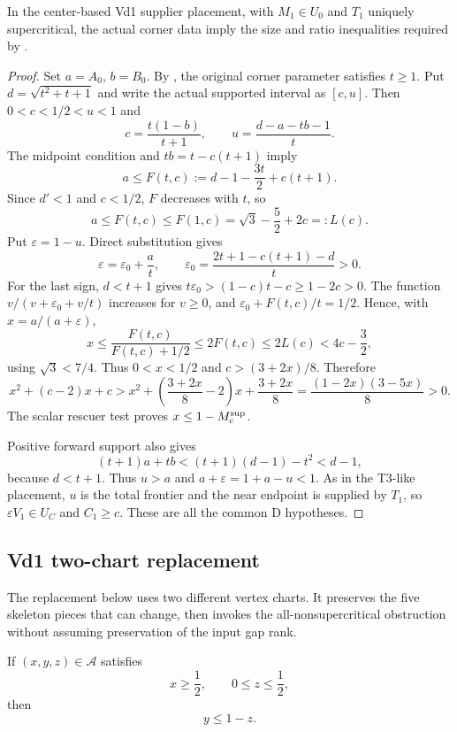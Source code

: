 \begin{lemma}
\label{lem:appendix-vd1-supported-tail}
In the center-based Vd1 supplier placement, with $M_1\in U_0$ and
$T_1$ uniquely supercritical, the actual corner data imply the size and
ratio inequalities required by .
\end{lemma}
\begin{proof}
Set $a=A_0$, $b=B_0$. By , the
original corner parameter satisfies $t\ge1$. Put
$d=\sqrt{t^2+t+1}$ and write the actual supported interval as $[c,u]$.
Then $0<c<1/2<u<1$ and
\[
 c=\frac{t(1-b)}{t+1},\qquad
 u=\frac{d-a-tb-1}{t}.
\]
The midpoint condition and $tb=t-c(t+1)$ imply
\[
 a\le F(t,c):=d-1-\frac{3t}{2}+c(t+1).
\]
Since $d'<1$ and $c<1/2$, $F$ decreases with $t$, so
\[
 a\le F(t,c)\le F(1,c)=\sqrt3-\frac52+2c=:L(c).
\]
Put $\varepsilon=1-u$. Direct substitution gives
\[
 \varepsilon=\varepsilon_0+\frac at,\qquad
 \varepsilon_0=\frac{2t+1-c(t+1)-d}{t}>0.
\]
For the last sign, $d<t+1$ gives
$t\varepsilon_0>(1-c)t-c\ge1-2c>0$.
The function $v/(v+\varepsilon_0+v/t)$ increases for $v\ge0$, and
$\varepsilon_0+F(t,c)/t=1/2$. Hence, with $x=a/(a+\varepsilon)$,
\[
 x\le\frac{F(t,c)}{F(t,c)+1/2}\le2F(t,c)\le2L(c)
 <4c-\frac32,
\]
using $\sqrt3<7/4$. Thus $0<x<1/2$ and $c>(3+2x)/8$. Therefore
\[
 x^2+(c-2)x+c>
 x^2+\left(\frac{3+2x}{8}-2\right)x+\frac{3+2x}{8}
 =\frac{(1-2x)(3-5x)}8>0.
\]
The scalar rescuer test  proves $x\le1-M_c^{\rm sup}$.

Positive forward support also gives
\[
 (t+1)a+tb<(t+1)(d-1)-t^2<d-1,
\]
because $d<t+1$. Thus $u>a$ and $a+\varepsilon=1+a-u<1$.
As in the T3-like placement, $u$ is the total frontier and the near
endpoint is supplied by $T_1$, so $\varepsilon V_1\in U_C$ and
$C_1\ge c$. These are all the common D hypotheses.
\end{proof}

\subsection{Vd1 two-chart replacement}

The replacement below uses two different vertex charts.  It preserves the
five skeleton pieces that can change, then invokes the all-nonsupercritical
obstruction without assuming preservation of the input gap rank.

\begin{lemma}
\label{lem:appendix-half-square-admissibility}
If \((x,y,z)\in\mathcal A\) satisfies
\[
 x\ge\frac12,
 \qquad
 0\le z\le\frac12,
\]
then
\[
 y\le1-z.
\]
\end{lemma}

